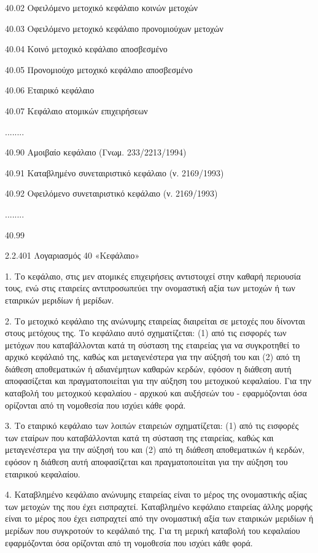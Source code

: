 \documentclass[A4,10pt,greek]{book}
\begin{document}
        40.02   Οφειλόμενο μετοχικό κεφάλαιο κοινών μετοχών  

        40.03   Οφειλόμενο μετοχικό κεφάλαιο προνομιούχων μετοχών  

        40.04   Κοινό μετοχικό κεφάλαιο αποσβεσμένο 

        40.05   Προνομιούχο μετοχικό κεφάλαιο αποσβεσμένο  

        40.06   Εταιρικό κεφάλαιο 

        40.07   Κεφάλαιο ατομικών επιχειρήσεων  

        ........

        40.90   Αμοιβαίο κεφάλαιο (Γνωμ. 233/2213/1994) 

        40.91   Καταβλημένο συνεταιριστικό κεφάλαιο (ν. 2169/1993) 

        40.92   Οφειλόμενο συνεταιριστικό κεφάλαιο (ν. 2169/1993) 

        ........

        40.99

2.2.401 Λογαριασμός 40 «Κεφάλαιο»

1. Το κεφάλαιο, στις μεν ατομικές επιχειρήσεις αντιστοιχεί στην καθαρή περιουσία τους, ενώ στις εταιρείες αντιπροσωπεύει την ονομαστική αξία των μετοχών ή των εταιρικών μεριδίων ή μερίδων.

2. Το μετοχικό κεφάλαιο της ανώνυμης εταιρείας διαιρείται σε μετοχές που δίνονται στους μετόχους της. Το κεφάλαιο αυτό σχηματίζεται: (1) από τις εισφορές των μετόχων που καταβάλλονται κατά τη σύσταση της εταιρείας για να συγκροτηθεί το αρχικό κεφάλαιό της, καθώς και μεταγενέστερα για την αύξησή του και (2) από τη διάθεση αποθεματικών ή αδιανέμητων καθαρών κερδών, εφόσον η διάθεση αυτή αποφασίζεται και πραγματοποιείται για την αύξηση του μετοχικού κεφαλαίου. Για την καταβολή του μετοχικού κεφαλαίου - αρχικού και αυξήσεών του - εφαρμόζονται όσα ορίζονται από τη νομοθεσία που ισχύει κάθε φορά.

3. Το εταιρικό κεφάλαιο των λοιπών εταιρειών σχηματίζεται: (1) από τις εισφορές των εταίρων που καταβάλλονται κατά τη σύσταση της εταιρείας, καθώς και μεταγενέστερα για την αύξησή του και (2) από τη διάθεση αποθεματικών ή κερδών, εφόσον η διάθεση αυτή αποφασίζεται και πραγματοποιείται για την αύξηση του εταιρικού κεφαλαίου.

4. Καταβλημένο κεφάλαιο ανώνυμης εταιρείας είναι το μέρος της ονομαστικής αξίας των μετοχών της που έχει εισπραχτεί. Καταβλημένο κεφάλαιο εταιρείας άλλης μορφής είναι το μέρος που έχει εισπραχτεί από την ονομαστική αξία των εταιρικών μεριδίων ή μερίδων που συγκροτούν το κεφάλαιό της. Για τη μερική καταβολή του κεφαλαίου εφαρμόζονται όσα ορίζονται από τη νομοθεσία που ισχύει κάθε φορά.
\end{document}
